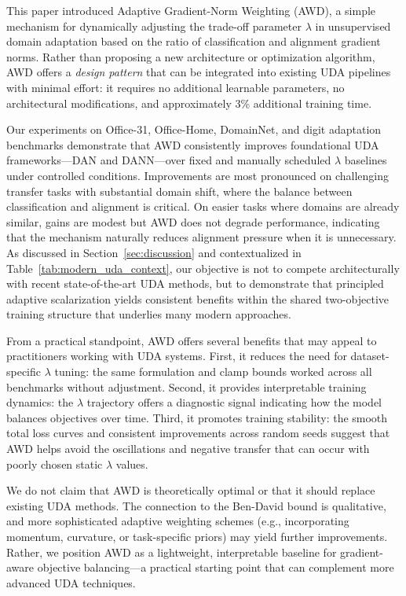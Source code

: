 \documentclass[pdflatex,sn-mathphys-num]{sn-jnl}
\theoremstyle{thmstyleone}
\theoremstyle{thmstyletwo}
\theoremstyle{thmstylethree}
\begin{document}
This paper introduced Adaptive Gradient-Norm Weighting (AWD), a simple mechanism for dynamically adjusting the trade-off parameter $\lambda$ in unsupervised domain adaptation based on the ratio of classification and alignment gradient norms. Rather than proposing a new architecture or optimization algorithm, AWD offers a \emph{design pattern} that can be integrated into existing UDA pipelines with minimal effort: it requires no additional learnable parameters, no architectural modifications, and approximately 3\% additional training time.

Our experiments on Office-31, Office-Home, DomainNet, and digit adaptation benchmarks demonstrate that AWD consistently improves foundational UDA frameworks—DAN and DANN—over fixed and manually scheduled $\lambda$ baselines under controlled conditions. Improvements are most pronounced on challenging transfer tasks with substantial domain shift, where the balance between classification and alignment is critical. On easier tasks where domains are already similar, gains are modest but AWD does not degrade performance, indicating that the mechanism naturally reduces alignment pressure when it is unnecessary. As discussed in Section~\ref{sec:discussion} and contextualized in Table~\ref{tab:modern_uda_context}, our objective is not to compete architecturally with recent state-of-the-art UDA methods, but to demonstrate that principled adaptive scalarization yields consistent benefits within the shared two-objective training structure that underlies many modern approaches.


From a practical standpoint, AWD offers several benefits that may appeal to practitioners working with UDA systems. First, it reduces the need for dataset-specific $\lambda$ tuning: the same formulation and clamp bounds worked across all benchmarks without adjustment. Second, it provides interpretable training dynamics: the $\lambda$ trajectory offers a diagnostic signal indicating how the model balances objectives over time. Third, it promotes training stability: the smooth total loss curves and consistent improvements across random seeds suggest that AWD helps avoid the oscillations and negative transfer that can occur with poorly chosen static $\lambda$ values.

We do not claim that AWD is theoretically optimal or that it should replace existing UDA methods. The connection to the Ben-David bound is qualitative, and more sophisticated adaptive weighting schemes (e.g., incorporating momentum, curvature, or task-specific priors) may yield further improvements. Rather, we position AWD as a lightweight, interpretable baseline for gradient-aware objective balancing---a practical starting point that can complement more advanced UDA techniques.
\end{document}
